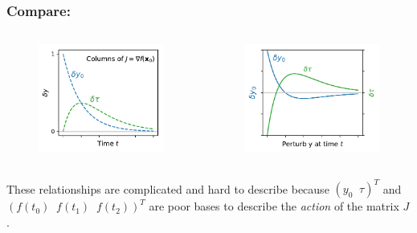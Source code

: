 \documentclass[xcolor={dvipsnames}]{beamer}
\begin{document}
\begin{frame}
\frametitle{Compare:}
\begin{columns}
    \begin{figure}
        \includegraphics[width=\textwidth]{figs/dy0dtau.pdf}
    \end{figure}
    \begin{figure}
        \includegraphics[width=\textwidth]{figs/perturb-y.pdf}
    \end{figure}
\end{columns}
These relationships are complicated and hard to describe because $(y_0 \; \; \tau)^T$
and $\left( f(t_0) \; \; f(t_1) \; \; f(t_2) \right)^T$ are poor bases to describe the \emph{action} of the matrix $J$.
\end{frame}
\end{document}
